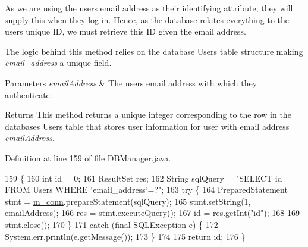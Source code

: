 As we are using the user\textquotesingle{}s email address as their identifying attribute, they will supply this when they log in. Hence, as the database relates everything to the user\textquotesingle{}s unique ID, we must retrieve this ID given the email address.

The logic behind this method relies on the database Users table structure making {\itshape email\+\_\+address} a unique field.


\begin{DoxyParams}{Parameters}
{\em email\+Address} & The user\textquotesingle{}s email address with which they authenticate.\\
\hline
\end{DoxyParams}
\begin{DoxyReturn}{Returns}
This method returns a unique integer corresponding to the row in the database\textquotesingle{}s Users table that stores user information for user with email address {\itshape email\+Address}. 
\end{DoxyReturn}


Definition at line 159 of file D\+B\+Manager.\+java.


\begin{DoxyCode}
159                                                            \{
160         \textcolor{keywordtype}{int} \textcolor{keywordtype}{id} = 0;
161         ResultSet res;
162         String sqlQuery = \textcolor{stringliteral}{"SELECT id FROM Users WHERE `email\_address`=?"};
163         \textcolor{keywordflow}{try} \{
164             PreparedStatement stmt = \mbox{\hyperlink{classcom_1_1activitytracker_1_1_d_b_manager_a064088d13ac09eb147fdc19268771521}{m\_conn}}.prepareStatement(sqlQuery);
165             stmt.setString(1, emailAddress);
166             res =  stmt.executeQuery();
167             \textcolor{keywordtype}{id} = res.getInt(\textcolor{stringliteral}{"id"});
168 
169             stmt.close();
170         \}
171         \textcolor{keywordflow}{catch} (\textcolor{keyword}{final} SQLException e) \{
172             System.err.println(e.getMessage());
173         \}
174 
175         \textcolor{keywordflow}{return} id;
176     \}
\end{DoxyCode}
\mbox{\label{classcom_1_1activitytracker_1_1_d_b_manager_aab14c61b3f3a17bdea10cab1b5fd9337}} 
